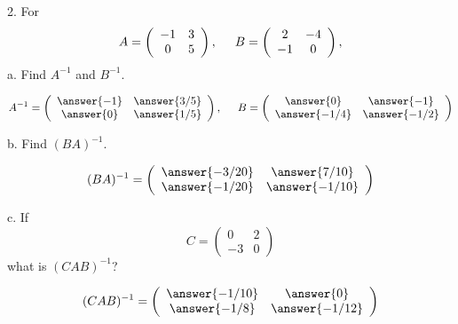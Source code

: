 \documentclass{ximera}
\begin{document}
\begin{exercise}
2. For 
\[ A= \left(\begin{array}{cc}
  -1 & 3   \\
  0 &  5
\end{array}\right), \hspace{.5cm} B= \left(\begin{array}{cc}
  2 & -4   \\
  -1 &  0
\end{array}\right),
\]
a. Find $A^{-1}$ and $B^{-1}$. 

\begin{prompt}
\[ A^{-1}= \left(\begin{array}{cc}
  \answer{-1} & \answer{3/5}   \\
  \answer{0} & \answer{1/5}
\end{array}\right), \hspace{.5cm} B= \left(\begin{array}{cc}
  \answer{0} & \answer{-1}   \\
  \answer{-1/4} & \answer{-1/2}
\end{array}\right)\]
\end{prompt}

b. Find $(BA)^{-1}$. 

\begin{prompt}
\[(BA)^{-1} = \left(\begin{array}{cc}
  \answer{-3/20} & \answer{7/10}   \\
  \answer{-1/20} & \answer{-1/10}
\end{array}\right)
\]
\end{prompt}

c. If 
\[C = \left(\begin{array}{cc}
  0&2\\
  -3&0
\end{array}\right)
\]
what is $(CAB)^{-1}$?

\begin{prompt}
\[(CAB)^{-1}= \left(\begin{array}{cc}
  \answer{-1/10} & \answer{0}   \\
  \answer{-1/8} & \answer{-1/12}
\end{array}\right)
\]
\end{prompt}
\end{exercise}
\end{document}
